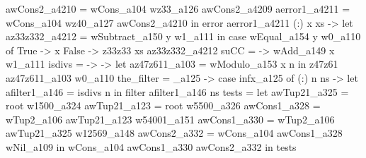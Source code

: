                                       awCons2_a4210 = wCons_a104 wz33_a126 awCons2_a4209
                                      aerror1_a4211 = wCons_a104 wz40_a127 awCons2_a4210
                                    in error aerror1_a4211
                                  (:) x xs ->
                                    let az33z332_a4212 = wSubtract_a150 y w1_a111
                                    in case wEqual_a154 y w0_a110 of
                                         True -> x
                                         False -> z33z33 xs az33z332_a4212
          suCC = \x -> wAdd_a149 x w1_a111
          isdivs = \n -> \x -> let az47z611_a103 = wModulo_a153 x n
                               in z47z61 az47z611_a103 w0_a110
          the_filter = \infx_a125 -> case infx_a125 of
                                       (:) n ns ->
                                         let afilter1_a146 = isdivs n
                                         in filter afilter1_a146 ns
          tests = let
                    awTup21_a325 = root w1500_a324
                    awTup21_a123 = root w5500_a326
                    awCons1_a328 = wTup2_a106 awTup21_a123 w54001_a151
                    awCons1_a330 = wTup2_a106 awTup21_a325 w12569_a148
                    awCons2_a332 = wCons_a104 awCons1_a328 wNil_a109
                  in wCons_a104 awCons1_a330 awCons2_a332
        in tests

